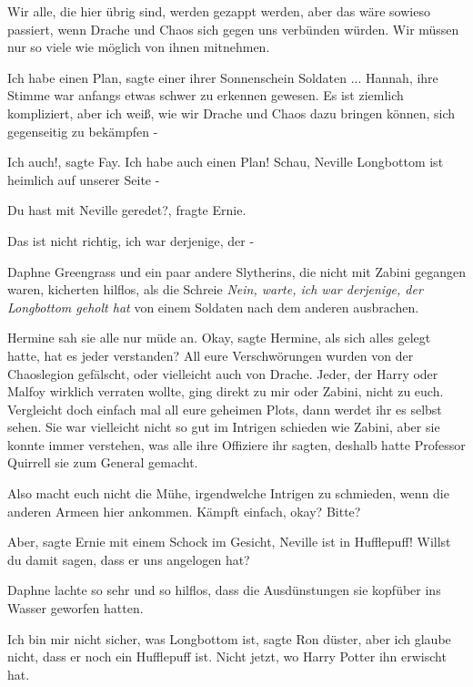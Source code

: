 \glqq{}Wir alle, die hier übrig sind, werden gezappt werden, aber das wäre
sowieso passiert, wenn Drache und Chaos sich gegen uns verbünden würden. Wir
müssen nur so viele wie möglich von ihnen mitnehmen.\grqq{}

\glqq{}Ich habe einen Plan\grqq{}, sagte einer ihrer Sonnenschein Soldaten ...
Hannah, ihre Stimme war anfangs etwas schwer zu erkennen gewesen. \glqq{}Es ist
ziemlich kompliziert, aber ich weiß, wie wir Drache und Chaos dazu bringen
können, sich gegenseitig zu bekämpfen -\grqq{}

\glqq{}Ich auch!\grqq{}, sagte Fay. \glqq{}Ich habe auch einen Plan! Schau,
Neville Longbottom ist heimlich auf unserer Seite -\grqq{}

\glqq{}Du hast mit Neville geredet?\grqq{}, fragte Ernie.

\glqq{}Das ist nicht richtig, ich war derjenige, der -\grqq{}

Daphne Greengrass und ein paar andere Slytherins, die nicht mit Zabini gegangen
waren, kicherten hilflos, als die Schreie \glqq{}\emph{Nein, warte, ich war
derjenige, der Longbottom geholt hat\grqq{}} von einem Soldaten nach dem
anderen ausbrachen.

Hermine sah sie alle nur müde an. \glqq{}Okay\grqq{}, sagte Hermine, als sich
alles gelegt hatte, \glqq{}hat es jeder verstanden? All eure Verschwörungen
wurden von der Chaoslegion gefälscht, oder vielleicht auch von Drache. Jeder,
der Harry oder Malfoy wirklich verraten wollte, ging direkt zu mir oder Zabini,
nicht zu euch. Vergleicht doch einfach mal all eure geheimen Plots, dann werdet
ihr es selbst sehen.\grqq{} Sie war vielleicht nicht so gut im Intrigen schieden wie
Zabini, aber sie konnte immer verstehen, was alle ihre Offiziere ihr sagten,
deshalb hatte Professor Quirrell sie zum General gemacht.

\glqq{}Also macht euch nicht die Mühe, irgendwelche Intrigen zu schmieden, wenn
die anderen Armeen hier ankommen. Kämpft einfach, okay? Bitte?\grqq{}

\glqq{}Aber\grqq{}, sagte Ernie mit einem Schock im Gesicht, \glqq{}Neville ist in
Hufflepuff! Willst du damit sagen, dass er uns angelogen hat?\grqq{}

Daphne lachte so sehr und so hilflos, dass die Ausdünstungen sie kopfüber ins
Wasser geworfen hatten.

\glqq{}Ich bin mir nicht sicher, was Longbottom ist\grqq{}, sagte Ron düster,
\glqq{}aber ich glaube nicht, dass er noch ein Hufflepuff ist. Nicht jetzt, wo
Harry Potter ihn erwischt hat.\grqq{}

